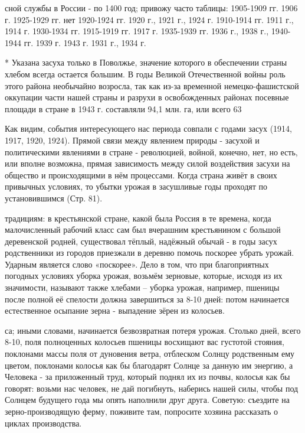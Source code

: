 сной службы в России - по 1400 год; привожу часто таблицы: 1905-1909 гг. 1906 г. 1925-1929 гг. нет 1920-1924 гг. 1920 г., 1921 г., 1924 г. 1910-1914 гг. 1911 г., 1914 г. 1930-1934 гг. 1915-1919 гг. 1917 г. 1935-1939 гг. 1936 г., 1938 г., 1940-1944 гг. 1939 г. 1943 г. 1931 г., 1934 г.

* Указана засуха только в Поволжье, значение которого в обеспечении страны хлебом всегда остается большим. В годы Великой Отечественной войны роль этого района необычайно возросла, так как из-за временной немецко-фашистской оккупации части нашей страны и разрухи в освобожденных районах посевные площади в стране в 1943 г. составляли 94,1 млн. га, или всего 63%

Как видим, события интересующего нас периода совпали с годами засух (1914, 1917, 1920, 1924). Прямой связи между явлением природы - засухой и политическими явлениями в стране - революцией, войной, конечно, нет, но есть, или вполне возможна, прямая зависимость между силой воздействия засухи на общество и происходящими в нём процессами. Когда страна живёт в своих привычных условиях, то убытки урожая в засушливые годы проходят по установившимся (Стр. 81).

традициям: в крестьянской стране, какой была Россия в те времена, когда малочисленный рабочий класс сам был вчерашним крестьянином с большой деревенской родней, существовал тёплый, надёжный обычай - в годы засух родственники из городов приезжали в деревню помочь поскорее убрать урожай. Ударным является слово «поскорее». Дело в том, что при благоприятных погодных условиях уборка урожая, возьмём зерновые, которые, исходя из их значимости, называют также хлебами – уборка урожая, например, пшеницы после полной её спелости должна завершиться за 8-10 дней: потом начинается естественное осыпание зерна - выпадение зёрен из колосьев.

са; иными словами, начинается безвозвратная потеря урожая. Столько дней, всего 8-10, поля полноценных колосьев пшеницы восхищают вас густотой стояния, поклонами массы поля от дуновения ветра, отблеском Солнцу родственным ему цветом, поклонами колосья как бы благодарят Солнце за данную им энергию, а Человека - за приложенный труд, который поднял их из почвы, колосья как бы говорят: возьми нас человек, не дай погибнуть, наберись нашей силы, чтобы под Солнцем будущего года мы опять наполнили друг друга. Советую: съездите на зерно-производящую ферму, поживите там, попросите хозяина рассказать о циклах производства.

